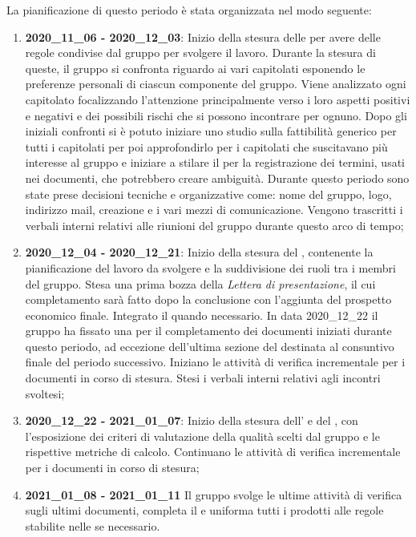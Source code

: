 La pianificazione di questo periodo è stata organizzata nel modo seguente:
\begin{enumerate}
\item \textbf{2020\_11\_06 - 2020\_12\_03}:
Inizio della stesura delle {\NdP} per avere delle regole condivise dal gruppo per svolgere il lavoro. Durante la stesura di queste, il gruppo si confronta riguardo ai vari capitolati esponendo le preferenze personali di ciascun componente del gruppo. Viene analizzato ogni capitolato focalizzando l'attenzione principalmente verso i loro aspetti positivi e negativi e dei possibili rischi che si possono incontrare per ognuno. Dopo gli iniziali confronti si è potuto iniziare uno studio sulla fattibilità generico per tutti i capitolati per poi approfondirlo per i capitolati che suscitavano più interesse al gruppo e iniziare a stilare il {\Glossario} per la registrazione dei termini, usati nei documenti, che potrebbero creare ambiguità. Durante questo periodo sono state prese decisioni tecniche e organizzative come: nome del gruppo, logo, indirizzo mail, creazione  e i vari mezzi di comunicazione. Vengono trascritti i verbali interni relativi alle riunioni del gruppo durante questo arco di tempo;
\item \textbf{2020\_12\_04 - 2020\_12\_21}:
Inizio della stesura del {\PdP}, contenente la pianificazione del lavoro da svolgere e la suddivisione dei ruoli tra i membri del gruppo. Stesa una prima bozza della \textit{Lettera di presentazione}, il cui completamento sarà fatto dopo la conclusione {\PdP} con l'aggiunta del prospetto economico finale. Integrato il {\Glossario} quando necessario. In data 2020\_12\_22 il gruppo ha fissato una  per il completamento dei documenti iniziati durante questo periodo, ad eccezione dell'ultima sezione del {\PdP} destinata al consuntivo finale del periodo successivo. Iniziano le attività di verifica incrementale per i documenti in corso di stesura. Stesi i verbali interni relativi agli incontri svoltesi;
\item \textbf{2020\_12\_22 - 2021\_01\_07}:
Inizio della stesura dell'{\AdR} e del {\PdQ}, con l'esposizione dei criteri di valutazione della qualità scelti dal gruppo e le rispettive metriche di calcolo. Continuano le attività di verifica incrementale per i documenti in corso di stesura;
\item \textbf{2021\_01\_08 - 2021\_01\_11}
Il gruppo svolge le ultime attività di verifica sugli ultimi documenti, completa il {\Glossario} e uniforma tutti i prodotti alle regole stabilite nelle {\NdP} se necessario.
\end{enumerate}
